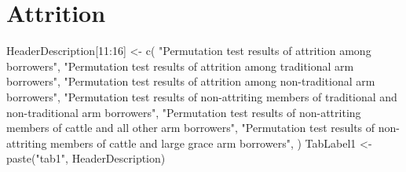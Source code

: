 \section{Attrition}

\begin{Schunk}
\begin{Sinput}
HeaderDescription[11:16] <- c(
   "Permutation test results of attrition among borrowers", 
     "Permutation test results of attrition among traditional arm borrowers",
     "Permutation test results of attrition among non-traditional arm borrowers",
     "Permutation test results of non-attriting members of traditional and non-traditional arm borrowers",
     "Permutation test results of non-attriting members of cattle and all other arm borrowers",
     "Permutation test results of non-attriting members of cattle and large grace arm borrowers",
    )
TabLabel1 <- paste("tab1", HeaderDescription)
\end{Sinput}
\end{Schunk}

